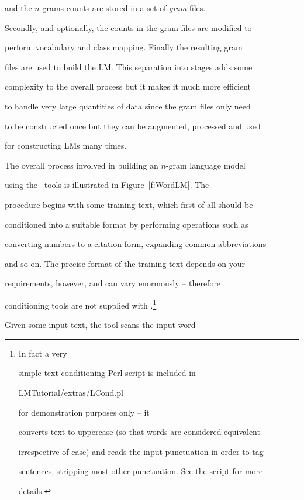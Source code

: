 and the $n$-grams counts are stored in a set of \textit{gram} files.


Secondly, and optionally, the counts in the gram files are modified to


perform vocabulary and class mapping.  Finally the resulting gram


files are used to build the LM. This separation into stages adds some


complexity to the overall process but it makes it much more efficient


to handle very large quantities of data since the gram files only need


to be constructed once but they can be augmented, processed and used


for constructing LMs many times.





The overall process involved in building an $n$-gram language model


using the \HTK\ tools is illustrated in Figure~\ref{f:WordLM}.  The


procedure begins with some training text, which first of all should be


conditioned into a suitable format by performing operations such as


converting numbers to a citation form, expanding common abbreviations


and so on.  The precise format of the training text depends on your


requirements, however, and can vary enormously -- therefore


conditioning tools are not supplied with \HTK.\footnote{In fact a very


simple text conditioning Perl script is included in {\tt


LMTutorial/extras/LCond.pl} for demonstration purposes only -- it


converts text to uppercase (so that words are considered equivalent


irrespective of case) and reads the input punctuation in order to tag


sentences, stripping most other punctuation.  See the script for more


details.}





Given some input text, the tool  scans the input word


